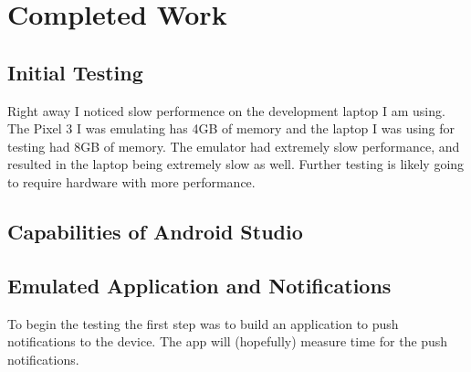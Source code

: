 \section{Completed Work}
\subsection{Initial Testing}
Right away I noticed slow performence on the development laptop I am using. 
The Pixel 3 I was emulating has 4GB of memory and the laptop I was using for testing had 8GB of memory. The emulator had extremely slow performance, and resulted in the laptop being extremely slow as well. 
Further testing is likely going to require hardware with more performance.
\subsection{Capabilities of Android Studio}
\subsection{Emulated Application and Notifications}
To begin the testing the first step was to build an application to push notifications to the device.
The app will (hopefully) measure time for the push notifications.